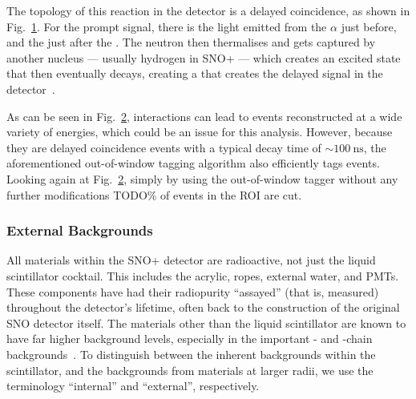 The topology of this reaction in the detector is a delayed coincidence, as shown in Fig.~\ref{fig:alpha_n_drawing}. %
For the prompt signal, there is the light emitted from the $\alpha$ just before, and the  just after the \alphan{}. The neutron then thermalises and gets captured by another nucleus --- usually hydrogen in SNO+ --- which creates an excited state that then eventually decays, creating a \ce{\gamma} that creates the delayed signal in the detector~\cite{}. %

\begin{figure}
    \centering
    \caption[]{}
    \label{fig:alpha_n_drawing}
\end{figure}

As can be seen in Fig.~\ref{fig:alpha_n_coincidence_cut_impact}, \alphan{} interactions can lead to events reconstructed at a wide variety of energies, which could be an issue for this analysis. However, because they are delayed coincidence events with a typical decay time of $\sim\SI{100}{\nano\second}$, the aforementioned out-of-window  tagging algorithm also efficiently tags \alphan{} events. Looking again at Fig.~\ref{fig:alpha_n_coincidence_cut_impact}, simply by using the out-of-window  tagger without any further modifications TODO\% of events in the ROI are cut.

\begin{figure}
    \centering
    \caption[]{}
    \label{fig:alpha_n_coincidence_cut_impact}
\end{figure}


\subsubsection{External Backgrounds}
All materials within the SNO+ detector are radioactive, not just the liquid scintillator cocktail. This includes the acrylic, ropes, external water, and PMTs. These components have had their radiopurity ``assayed'' (that is, measured) throughout the detector's lifetime, often back to the construction of the original SNO detector itself. The materials other than the liquid scintillator are known to have far higher background levels, especially in the important - and -chain backgrounds~\cite{}. %
To distinguish between the inherent backgrounds within the scintillator, and the backgrounds from materials at larger radii, we use the terminology ``internal'' and ``external'', respectively.

